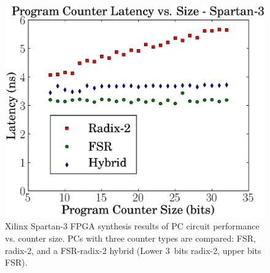 \documentclass[5p, twocolumn]{elsarticle}
\begin{document}
\begin{figure}[ht!]
\begin{center}
\includegraphics[width=\linewidth]{graphs/hybrid_pc.eps}
\caption[Spartan-3 synthesis results of PC performance vs. counter size]{Xilinx
Spartan-3 FPGA synthesis results of PC circuit performance vs.
counter size. PCs with three counter types are compared: FSR, radix-2, and a
FSR-radix-2 hybrid (Lower 3~bits radix-2, upper bits FSR).}
\label{GRAPH_PC}
\end{center}
\end{figure}
\end{document}
